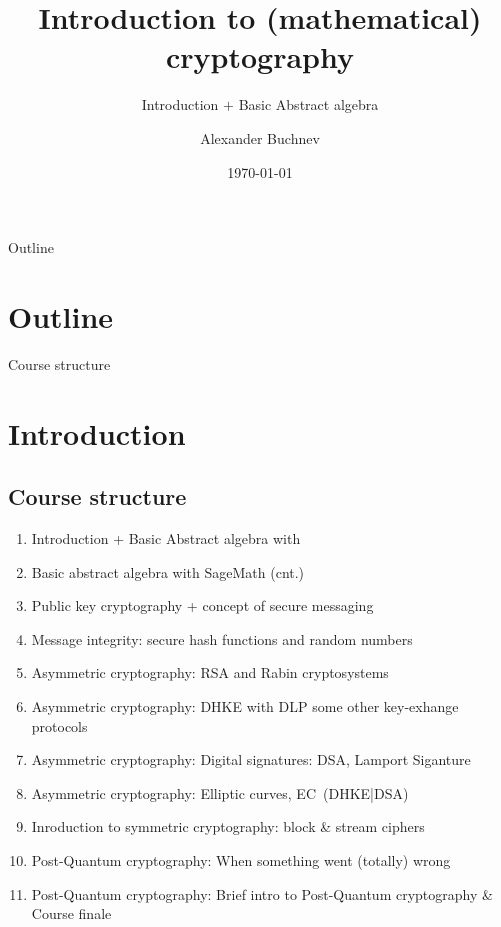 \documentclass{beamer}
\title{Introduction to (mathematical) cryptography}
\subtitle{Introduction $+$ Basic Abstract algebra}
\author{Alexander Buchnev}
\date{\monthYear\today}
\begin{document}
\frame{
	\titlepage
}

\begin{frame}{Outline}
    \section{Outline}
	\tableofcontents
\end{frame}

\begin{frame}{Course structure}
    \section{Introduction}
    \subsection{Course structure}
    \begin{enumerate}
        \item Introduction + Basic Abstract algebra with 
        \item Basic abstract algebra with SageMath (cnt.)
        \item Public key cryptography + concept of secure messaging %
        \item Message integrity: secure hash functions and random numbers
        \item Asymmetric cryptography: RSA and Rabin cryptosystems
        \item Asymmetric cryptography: DHKE with DLP some other key-exhange protocols 
        \item Asymmetric cryptography: Digital signatures: DSA, Lamport Siganture
        \item Asymmetric cryptography: Elliptic curves, EC~(DHKE|DSA)
        \item Inroduction to symmetric cryptography: block \& stream ciphers
        \item Post-Quantum cryptography: When something went (totally) wrong
        \item Post-Quantum cryptography: Brief intro to Post-Quantum cryptography \& Course finale
    \end{enumerate}
\end{frame}
\end{document}
